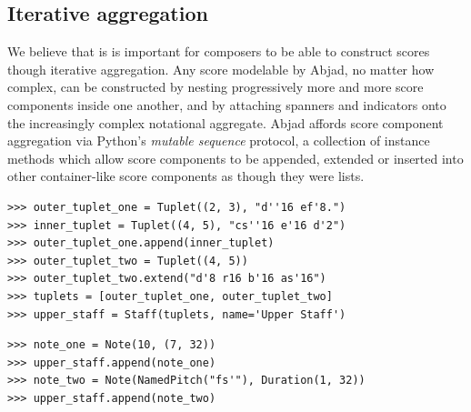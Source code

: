 \documentclass{article}
\begin{document}
\subsection{Iterative aggregation}

We believe that is is important for composers to be able to construct scores
though iterative aggregation. Any score modelable by Abjad, no matter how
complex, can be constructed by nesting progressively more and more score
components inside one another, and by attaching spanners and indicators onto
the increasingly complex notational aggregate. Abjad affords score component
aggregation via Python's \emph{mutable sequence} protocol, a collection of
instance methods which allow score components to be appended, extended or
inserted into other container-like score components as though they were lists.

\begin{lstlisting}
>>> outer_tuplet_one = Tuplet((2, 3), "d''16 ef'8.")
>>> inner_tuplet = Tuplet((4, 5), "cs''16 e'16 d'2")
>>> outer_tuplet_one.append(inner_tuplet)
>>> outer_tuplet_two = Tuplet((4, 5))
>>> outer_tuplet_two.extend("d'8 r16 b'16 as'16")
>>> tuplets = [outer_tuplet_one, outer_tuplet_two]
>>> upper_staff = Staff(tuplets, name='Upper Staff')
\end{lstlisting}

\begin{lstlisting}
>>> note_one = Note(10, (7, 32))
>>> upper_staff.append(note_one)
>>> note_two = Note(NamedPitch("fs'"), Duration(1, 32))
>>> upper_staff.append(note_two)
\end{lstlisting}

\end{document}
